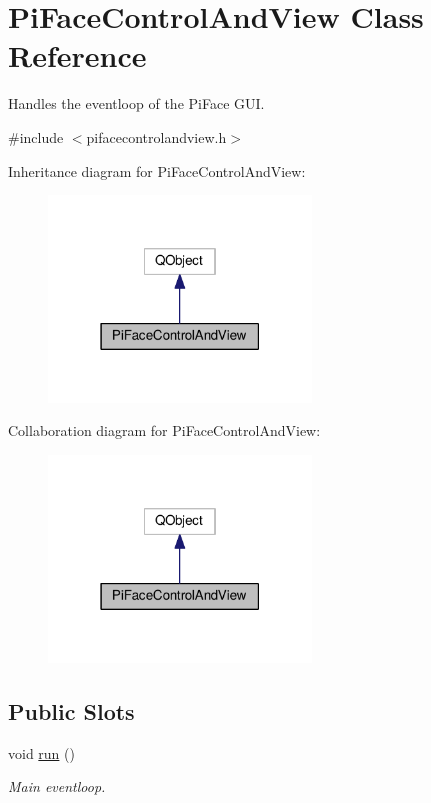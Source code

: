 \hypertarget{classPiFaceControlAndView}{}\section{Pi\+Face\+Control\+And\+View Class Reference}
\label{classPiFaceControlAndView}


Handles the eventloop of the Pi\+Face G\+UI.  




{\ttfamily \#include $<$pifacecontrolandview.\+h$>$}



Inheritance diagram for Pi\+Face\+Control\+And\+View\+:
\nopagebreak
\begin{figure}[H]
\begin{center}
\leavevmode
\includegraphics[width=198pt]{classPiFaceControlAndView__inherit__graph}
\end{center}
\end{figure}


Collaboration diagram for Pi\+Face\+Control\+And\+View\+:
\nopagebreak
\begin{figure}[H]
\begin{center}
\leavevmode
\includegraphics[width=198pt]{classPiFaceControlAndView__coll__graph}
\end{center}
\end{figure}
\subsection*{Public Slots}
\begin{DoxyCompactItemize}
\item 
void \hyperlink{classPiFaceControlAndView_a5463b09284910cea9db7997f59b5345a}{run} ()
\begin{DoxyCompactList}\small\item\em Main eventloop. \end{DoxyCompactList}\end{DoxyCompactItemize}
